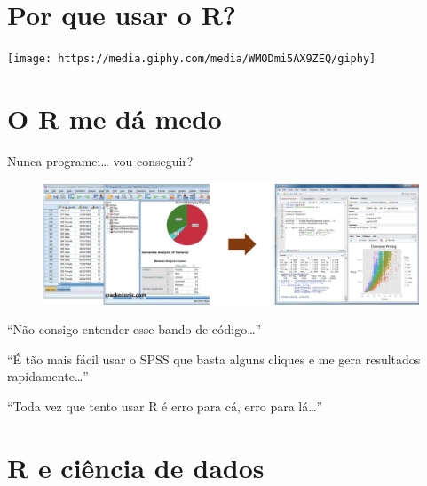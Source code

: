 \documentclass[
]{article}
\begin{document}
\hypertarget{por-que-usar-o-r}{%
\section{Por que usar o R?}\label{por-que-usar-o-r}}

\begin{center}\texttt{[image: https://media.giphy.com/media/WMODmi5AX9ZEQ/giphy]} \end{center}

\hypertarget{o-r-me-duxe1-medo}{%
\section{O R me dá medo}\label{o-r-me-duxe1-medo}}

Nunca programei\ldots{} vou conseguir?

\begin{figure}

{\centering \includegraphics[width=1\linewidth,height=1\textheight]{imagem/r_spss} 

}

\caption{ }\label{fig:r_spss, figures-side}
\end{figure}

``Não consigo entender esse bando de código\ldots{}''

``É tão mais fácil usar o SPSS que basta alguns cliques e me gera
resultados rapidamente\ldots{}''

``Toda vez que tento usar R é erro para cá, erro para lá\ldots{}''

\hypertarget{r-e-ciuxeancia-de-dados}{%
\section{R e ciência de dados}\label{r-e-ciuxeancia-de-dados}}
\end{document}
